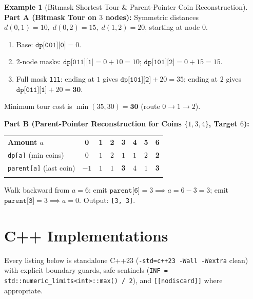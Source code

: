 \documentclass[11pt,a4paper]{article}
\theoremstyle{definition}
\newtheorem{example}{Example}[section]
\begin{document}
\begin{example}[Bitmask Shortest Tour \& Parent-Pointer Coin Reconstruction]
\textbf{Part A (Bitmask Tour on $3$ nodes):} Symmetric distances $d(0,1) = 10,\; d(0,2) = 15,\; d(1,2) = 20$, starting at node $0$.
\begin{enumerate}
    \item Base: $\texttt{dp[001][0]} = 0$.
    \item 2-node masks: $\texttt{dp[011][1]} = 0 + 10 = 10$; $\texttt{dp[101][2]} = 0 + 15 = 15$.
    \item Full mask \texttt{111}: ending at $1$ gives $\texttt{dp[101][2]} + 20 = 35$; ending at $2$ gives $\texttt{dp[011][1]} + 20 = \mathbf{30}$.
\end{enumerate}
Minimum tour cost is $\min(35, 30) = \mathbf{30}$ (route $0 \to 1 \to 2$).

\textbf{Part B (Parent-Pointer Reconstruction for Coins $\{1, 3, 4\}$, Target $6$):}
\begin{center}
\begingroup\small{}
\begin{tabular}{lccccccc}
\arrayrulecolor{primaryblue}\toprule[1.1pt]
\rowcolor{primaryblue!10}
\textcolor{primaryblue}{\textbf{Amount $a$}} & \textbf{0} & \textbf{1} & \textbf{2} & \textbf{3} & \textbf{4} & \textbf{5} & \textbf{6} \\
\arrayrulecolor{codeframe}\midrule[0.6pt]
\texttt{dp[a]} (min coins) & $0$ & $1$ & $2$ & $1$ & $1$ & $2$ & \textbf{2} \\
\texttt{parent[a]} (last coin) & $-1$ & $1$ & $1$ & \textbf{3} & $4$ & $1$ & \textbf{3} \\
\arrayrulecolor{primaryblue}\bottomrule[1.1pt]
\end{tabular}
\endgroup
\end{center}
Walk backward from $a = 6$: emit $\texttt{parent[6]} = 3 \implies a = 6 - 3 = 3$; emit $\texttt{parent[3]} = 3 \implies a = 0$. Output: \texttt{[3, 3]}.
\end{example}

\section{C++ Implementations}

Every listing below is standalone C++23 (\texttt{-std=c++23 -Wall -Wextra} clean) with explicit boundary guards, safe sentinels (\texttt{INF = std::numeric\_limits<int>::max() / 2}), and \texttt{[[nodiscard]]} where appropriate.
\end{document}
